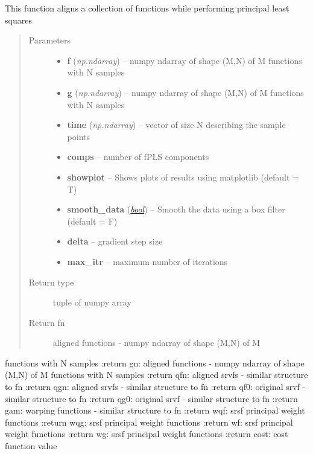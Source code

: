 \documentclass[letterpaper,10pt,english]{sphinxmanual}
\begin{document}
\begin{fulllineitems}
\label{time_warping:time_warping.align_fPLS}
This function aligns a collection of functions while performing
principal least squares
\begin{quote}\begin{description}
\item[{Parameters}] \leavevmode\begin{itemize}
\item {} 
\textbf{f} (\emph{np.ndarray}) -- numpy ndarray of shape (M,N) of M functions with N samples

\item {} 
\textbf{g} (\emph{np.ndarray}) -- numpy ndarray of shape (M,N) of M functions with N samples

\item {} 
\textbf{time} (\emph{np.ndarray}) -- vector of size N describing the sample points

\item {} 
\textbf{comps} -- number of fPLS components

\item {} 
\textbf{showplot} -- Shows plots of results using matplotlib (default = T)

\item {} 
\textbf{smooth\_data} (\href{http://docs.python.org/library/functions.html\#bool}{\emph{bool}}) -- Smooth the data using a box filter (default = F)

\item {} 
\textbf{delta} -- gradient step size

\item {} 
\textbf{max\_itr} -- maximum number of iterations

\end{itemize}

\item[{Return type}] \leavevmode
tuple of numpy array

\item[{Return fn}] \leavevmode
aligned functions - numpy ndarray of shape (M,N) of M

\end{description}\end{quote}

functions with N samples
:return gn: aligned functions - numpy ndarray of shape (M,N) of M
functions with N samples
:return qfn: aligned srvfs - similar structure to fn
:return qgn: aligned srvfs - similar structure to fn
:return qf0: original srvf - similar structure to fn
:return qg0: original srvf - similar structure to fn
:return gam: warping functions - similar structure to fn
:return wqf: srsf principal weight functions
:return wqg: srsf principal weight functions
:return wf: srsf principal weight functions
:return wg: srsf principal weight functions
:return cost: cost function value

\end{fulllineitems}
\end{document}
